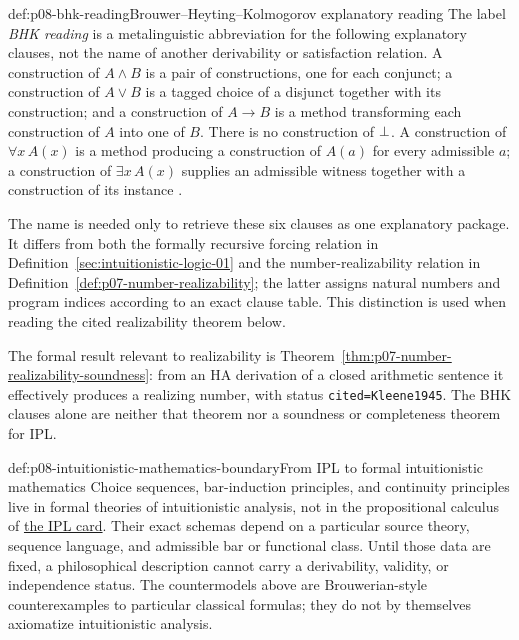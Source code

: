 \begin{hbdefinition}{def:p08-bhk-reading}{Brouwer--Heyting--Kolmogorov explanatory reading}
The label \emph{BHK reading} is a metalinguistic abbreviation for the
following explanatory clauses, not the name of another derivability or
satisfaction relation.  A construction of \(A\land B\) is a pair of
constructions, one for each conjunct; a construction of \(A\lor B\) is a
tagged choice of a disjunct together with its construction; and a construction
of \(A\to B\) is a method transforming each construction of \(A\) into one of
\(B\).  There is no construction of \(\bot\).  A construction of
\(\forall x\,A(x)\) is a method producing a construction of \(A(a)\) for every
admissible \(a\); a construction of \(\exists x\,A(x)\) supplies an admissible
witness together with a construction of its instance
\cite{Heyting1956,TroelstraVanDalen1988}.

The name is needed only to retrieve these six clauses as one explanatory
package.  It differs from both the formally recursive forcing relation in
Definition~\ref{sec:intuitionistic-logic-01} and the number-realizability relation in
Definition~\ref{def:p07-number-realizability}; the latter assigns natural
numbers and program indices according to an exact clause table.  This
distinction is used when reading the cited realizability theorem below.
\end{hbdefinition}

The formal result relevant to realizability is
Theorem~\ref{thm:p07-number-realizability-soundness}: from an HA derivation of
a closed arithmetic sentence it effectively produces a realizing number, with
status \texttt{cited=Kleene1945}.  The BHK clauses alone are neither that
theorem nor a soundness or completeness theorem for IPL.

\begin{proofboundary}{def:p08-intuitionistic-mathematics-boundary}{From IPL to formal intuitionistic mathematics}
Choice sequences, bar-induction principles, and continuity principles live in
formal theories of intuitionistic analysis, not in the propositional calculus
of \hyperref[entry:p08-ipl]{the IPL card}.  Their exact schemas depend on a
particular source theory, sequence language, and admissible bar or functional
class.  Until those data are fixed, a philosophical description cannot carry
a derivability, validity, or independence status.  The countermodels above
are Brouwerian-style counterexamples to particular classical formulas; they do
not by themselves axiomatize intuitionistic analysis.
\end{proofboundary}

